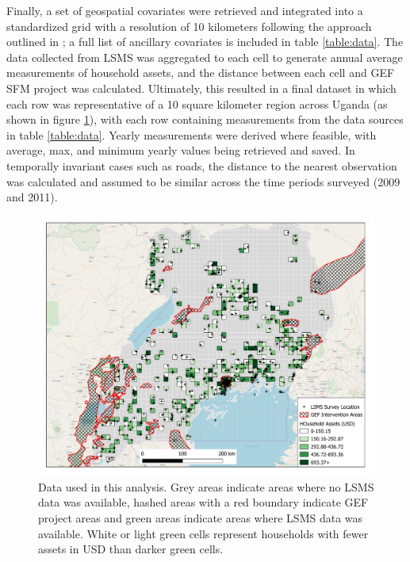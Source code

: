 \documentclass[sustainability,article,submit,moreauthors,pdftex]{Definitions/mdpi}
\begin{document}
Finally, a set of geospatial covariates were retrieved and integrated into a standardized grid with a resolution of 10 kilometers following the approach outlined in \cite{goodman2019}; a full list of ancillary covariates is included in table \ref{table:data}.  The data collected from LSMS was aggregated to each cell to generate annual average measurements of household assets, and the distance between each cell and GEF SFM project was calculated. Ultimately, this resulted in a final dataset in which each row was representative of a 10 square kilometer region across Uganda (as shown in figure \ref{fig:data}), with each row containing measurements from the data sources in table \ref{table:data}. Yearly measurements were derived where feasible, with average, max, and minimum yearly values being retrieved and saved.  In temporally invariant cases such as roads, the distance to the nearest observation was calculated and assumed to be similar across the time periods surveyed (2009 and 2011).


\begin{figure}[ht]
\includegraphics[width=\textwidth]{Figures/final_figure1.pdf}
\caption{Data used in this analysis. Grey areas indicate areas where no LSMS data was available, hashed areas with a red boundary indicate GEF project areas and green areas indicate areas where LSMS data was available. White or light green cells represent households with fewer assets in USD than darker green cells.}
\label{fig:data}
\end{figure}
\end{document}
